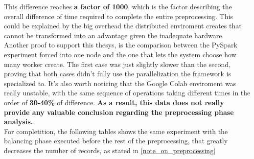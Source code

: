 \documentclass[
	letterpaper, %
	10pt, %
]{class}
\begin{document}
This difference reaches \textbf{a factor of 1000}, which is the factor describing the overall difference of time required to complete the entire preprocessing.
This could be explained by the big overhead the distributed enviroment creates that cannot be transformed into an advantage given the inadequate hardware.\\

Another proof to support this thesys, is the comparison between the PySpark experiment forced into one node and the one that lets the system choose how many worker create.
The first case was just slightly slower than the second, proving that both cases didn't fully use the parallelization the framework is specialized to.
It's also worth noticing that the Google Colab enviroment was really unstable, with the same sequence of operations taking different times in the order of \textbf{30-40\%} of difference.
\textbf{As a result, this data does not really provide any valuable conclusion regarding the preprocessing phase analysis.}\\

For completition, the following tables shows the same experiment with the balancing phase executed before the rest of the preprocessing, that greatly decreases the number of records, as stated in \ref{note_on_preprocessing}
\end{document}
